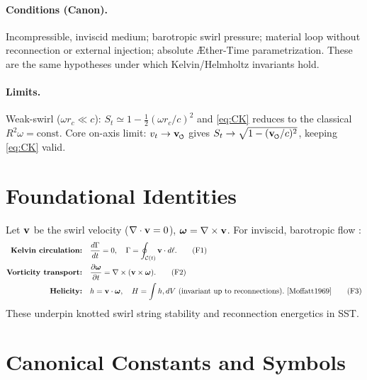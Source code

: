 \documentclass[11pt]{article}
\begin{document}
    \paragraph{Conditions (Canon).}
    Incompressible, inviscid medium; barotropic swirl pressure; material loop without reconnection or
    external injection; absolute Æther-Time parametrization. These are the same hypotheses under which
    Kelvin/Helmholtz invariants hold.

    \paragraph{Limits.}
    Weak-swirl ($\omega r_c\!\ll\!c$): $S_t\simeq 1-\tfrac{1}{2}(\omega r_c/c)^2$ and \eqref{eq:CK} reduces to the
    classical $R^2\omega=\text{const}$. Core on-axis limit: $v_t\to\vswirl$ gives
    $S_t\to \sqrt{1-(\vswirl/c)^2}$, keeping \eqref{eq:CK} valid.

\section{Foundational Identities}
\label{sec:foundational-identities}
    Let $\vb v$ be the swirl velocity ($\nabla\cdot \vb v=0$), $\bm{\omega}=\nabla\times \vb v$. For inviscid, barotropic flow \cite{Helmholtz1858,Kelvin1869,Batchelor1967,LandauLifshitz1987}:
    \begin{align}
    \textbf{Kelvin circulation:} & \quad \frac{d\Gamma}{dt}=0,\quad \Gamma=\oint_{\mathcal{C}(t)} \vb v\cdot d\vb \ell. \tag{F1} \label{eq:kelvin} \\
    \textbf{Vorticity transport:} & \quad \pdv{\bm{\omega}}{t} = \nabla\times(\vb v\times \bm{\omega}). \tag{F2} \label{eq:vorticity-transport}\\
    \textbf{Helicity:} & \quad h=\vb v\cdot \bm{\omega},\quad H=\int h, dV\ \text{(invariant up to reconnections)}.~\cite{Moffatt1969} \tag{F3}\label{eq:helicity}
    \end{align}
    These underpin knotted swirl string stability and reconnection energetics in SST.


\section{Canonical Constants and Symbols}
\label{sec:canonical_constants}
\end{document}
